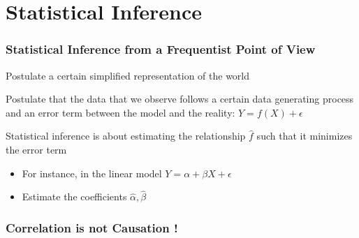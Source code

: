 \documentclass{beamer}
\newenvironment{wideitemize}{\itemize\addtolength{\itemsep}{10pt}}{\enditemize}
\begin{document}
\section{Statistical Inference}

\begin{frame}
  \frametitle{Statistical Inference from a Frequentist Point of View}
  \begin{wideitemize}
    \item Postulate a certain simplified representation of the world
    \item Postulate that the data that we observe follows a certain data generating process and an error term between the model and the reality: $Y = f(X) + \epsilon$
    \item Statistical inference is about estimating the relationship $\hat{f}$ such that it minimizes the error term
      \begin{itemize}
      \item For instance, in the linear model $Y = \alpha + \beta X + \epsilon$
      \item Estimate the coefficients $\hat{\alpha}, \hat{\beta}$
      \end{itemize}

      
  \end{wideitemize}
\end{frame}


\begin{frame}
\frametitle{Correlation is not Causation !}
\end{frame}
\end{document}
